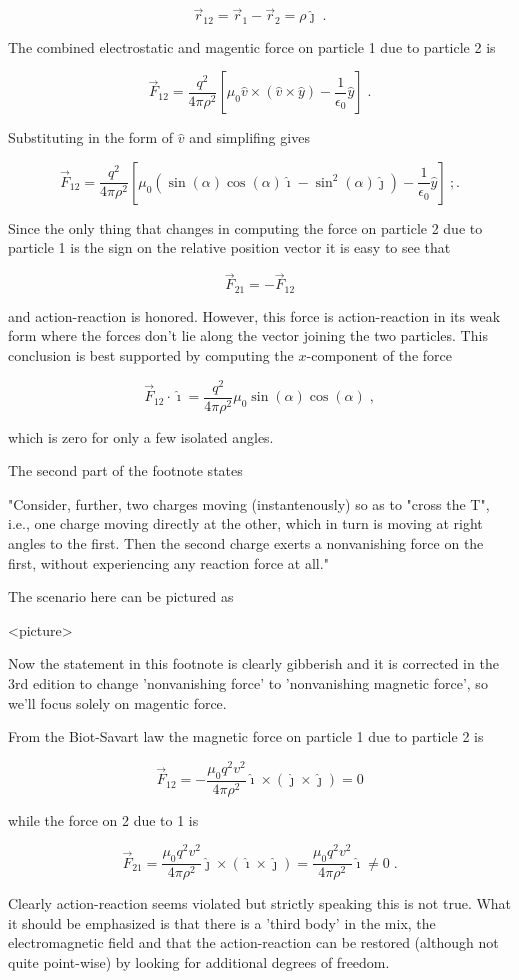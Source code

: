 \documentclass[12pt]{article}
\begin{document}
\[ \vec r_{12} = \vec r_{1} - \vec r_{2} = \rho \hat \jmath \; .\]

The combined electrostatic and magentic force on particle 1 due to particle 2 is

\[ \vec F_{12} = \frac{q^2}{4 \pi \rho^2} \left[ \mu_0 \hat v \times ( \hat v \times \hat y ) - \frac{1}{\epsilon_0} \hat y \right] \; .\]

Substituting in the form of $\hat v$ and simplifing gives

\[ \vec F_{12} = \frac{q^2}{4 \pi \rho^2} \left[ \mu_0 \left( \sin(\alpha) \cos(\alpha) \hat \imath - \sin^2(\alpha) \hat \jmath \right) - \frac{1}{\epsilon_0} \hat y \right] \ ;. \]

Since the only thing that changes in computing the force on particle 2 due to particle 1 is the sign on the relative position vector it is easy to see that

\[ \vec F_{21} = -\vec F_{12} \]

and action-reaction is honored.  However, this force is action-reaction in its weak form where the forces don't lie along the vector joining the two particles.  This conclusion is best supported by computing the $x$-component of the force

\[ \vec F_{12} \cdot \hat \imath = \frac{q^2}{4 \pi \rho^2} \mu_0 \sin(\alpha) \cos(\alpha) \; , \]

which is zero for only a few isolated angles.

The second part of the footnote states

"Consider, further, two charges moving (instantenously) so as to "cross the T", i.e., one charge moving directly at the other, which in turn is moving at right angles to the first.  Then the second charge exerts a nonvanishing force on the first, without experiencing any reaction force at all."

The scenario here can be pictured as

<picture>

Now the statement in this footnote is clearly gibberish and it is corrected in the 3rd edition to change 'nonvanishing force' to 'nonvanishing magnetic force', so we'll focus solely on magentic force.

From the Biot-Savart law the magnetic force on particle 1 due to particle 2 is 

\[ \vec F_{12} = -\frac{\mu_0 q^2 v^2}{4 \pi \rho^2} \hat \imath \times ( \hat \jmath \times \hat \jmath ) = 0 \]

while the force on 2 due to 1 is 

\[ \vec F_{21} =  \frac{\mu_0 q^2 v^2}{4 \pi \rho^2} \hat \jmath \times ( \hat \imath \times \hat \jmath ) = \frac{\mu_0 q^2 v^2}{4 \pi \rho^2} \hat \imath \neq 0 \; .\]

Clearly action-reaction seems violated but strictly speaking this is not true.  What it should be emphasized is that there is a 'third body' in the mix, the electromagnetic field and that the action-reaction can be restored (although not quite point-wise) by looking for additional degrees of freedom.
\end{document}
